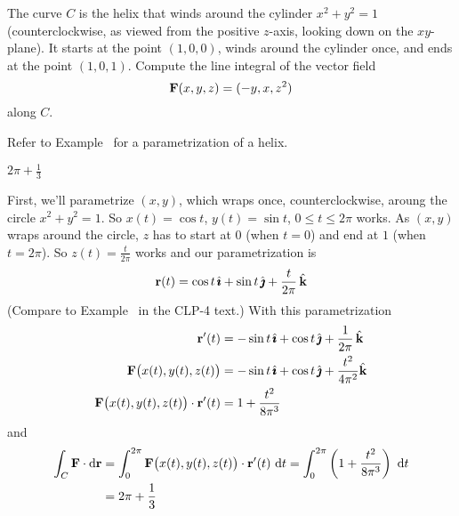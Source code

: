 \begin{question}[M317 2008D] %
The curve $C$ is the helix that winds around the cylinder $x^2 + y^2 = 1$ 
(counterclockwise, as viewed from the positive $z$-axis, looking 
down on the $xy$-plane). It starts at the point $(1, 0, 0)$, winds 
around the cylinder once, and ends at the point $(1, 0, 1)$.
Compute the line integral of the vector field 
\begin{equation*}
\mathbf{F}(x, y, z) = (-y, x, z^2)
\end{equation*}
along $C$.
\end{question}

\begin{hint} 
Refer to Example~ for a parametrization of a helix.
\end{hint}

\begin{answer} 
$2\pi+\frac{1}{3}$
\end{answer}

\begin{solution} First, we'll parametrize $(x,y)$, which wraps once, 
counterclockwise, aroung the circle $x^2+y^2=1$. So
$x(t) = \cos t$, $y(t) = \sin t$, $0\le t\le 2\pi$ works. As $(x,y)$ wraps
around the circle, $z$ has to start at $0$ (when $t=0$) and end at $1$
(when $t=2\pi$). 
So $z(t) =\frac{t}{2\pi}$ works and our parametrization 
is
\begin{equation*}
\mathbf{r}(t) = \cos t\,\hat{\pmb{\imath}} +\sin t\,\hat{\pmb{\jmath}} +\frac{t}{2\pi}\,\hat{\mathbf{k}}
\end{equation*}
(Compare to Example~ in the CLP-4 text.)
With this parametrization
\begin{align*}
\mathbf{r}'(t) &= -\sin t\,\hat{\pmb{\imath}} +\cos t\,\hat{\pmb{\jmath}} +\frac{1}{2\pi}\,\hat{\mathbf{k}} \\
\mathbf{F}\big(x(t),y(t),z(t)\big)& = -\sin t\,\hat{\pmb{\imath}} + \cos t\,\hat{\pmb{\jmath}}
                                         + \frac{t^2}{4\pi^2} \hat{\mathbf{k}} \\
\mathbf{F}\big(x(t),y(t),z(t)\big)\cdot\mathbf{r}'(t)& = 1 + \frac{t^2}{8\pi^3} 
\end{align*}
and
\begin{align*}
\int_C \mathbf{F}\cdot\mathrm{d}\mathbf{r}
&= \int_0^{2\pi} \mathbf{F}\big(x(t),y(t),z(t)\big)\cdot\mathbf{r}'(t)\ \mathrm{d}t
= \int_0^{2\pi}\left(1 + \frac{t^2}{8\pi^3} \right)\ \mathrm{d}t \\
&=2\pi+\frac{1}{3}
\end{align*}

\end{solution}


